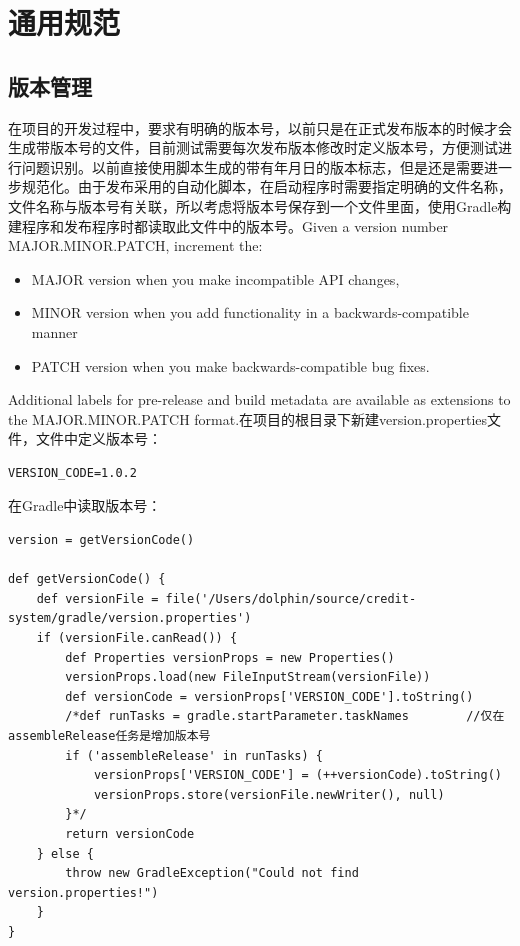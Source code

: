 \documentclass[letter]{book}
\begin{document}
\section{通用规范}

\subsection{版本管理}

在项目的开发过程中，要求有明确的版本号，以前只是在正式发布版本的时候才会生成带版本号的文件，目前测试需要每次发布版本修改时定义版本号，方便测试进行问题识别。以前直接使用脚本生成的带有年月日的版本标志，但是还是需要进一步规范化。由于发布采用的自动化脚本，在启动程序时需要指定明确的文件名称，文件名称与版本号有关联，所以考虑将版本号保存到一个文件里面，使用Gradle构建程序和发布程序时都读取此文件中的版本号。Given a version number MAJOR.MINOR.PATCH, increment the:

\begin{itemize}
	\item{MAJOR version when you make incompatible API changes,}
    \item{MINOR version when you add functionality in a backwards-compatible manner}
	\item{PATCH version when you make backwards-compatible bug fixes.}
\end{itemize}

Additional labels for pre-release and build metadata are available as extensions to the MAJOR.MINOR.PATCH format.在项目的根目录下新建version.properties文件，文件中定义版本号：

\begin{lstlisting}
VERSION_CODE=1.0.2
\end{lstlisting}

在Gradle中读取版本号：

\begin{lstlisting}
version = getVersionCode()

def getVersionCode() {
	def versionFile = file('/Users/dolphin/source/credit-system/gradle/version.properties')
	if (versionFile.canRead()) {
		def Properties versionProps = new Properties()
		versionProps.load(new FileInputStream(versionFile))
		def versionCode = versionProps['VERSION_CODE'].toString()
		/*def runTasks = gradle.startParameter.taskNames        //仅在assembleRelease任务是增加版本号
		if ('assembleRelease' in runTasks) {
			versionProps['VERSION_CODE'] = (++versionCode).toString()
			versionProps.store(versionFile.newWriter(), null)
		}*/
		return versionCode
	} else {
		throw new GradleException("Could not find version.properties!")
	}
}
\end{lstlisting}
\end{document}
